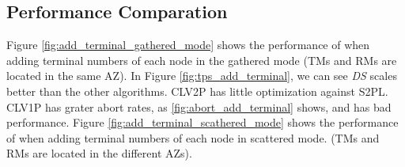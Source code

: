 \documentclass[conference]{IEEEtran}
\begin{document}
\subsection{Performance Comparation}
Figure \ref{fig:add_terminal_gathered_mode} shows the performance of when adding terminal numbers of each node in the gathered mode
(TMs and RMs are located in the same AZ).
In Figure \ref{fig:tps_add_terminal}, we can see \emph{DS} scales better than the other algorithms.
CLV2P has little optimization against S2PL.
CLV1P has grater abort rates,  as \ref{fig:abort_add_terminal} shows, and has bad performance.
Figure \ref{fig:add_terminal_scathered_mode} shows the performance of when adding terminal numbers of each node in scattered mode.
(TMs and RMs are located in the different AZs).


\begin{figure}[htbp]
  \centering

\end{figure}
\end{document}
